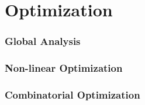\part{Optimization}\label{part:optimization}

\section{Global Analysis}\label{sec:global_analysis}

\section{Non-linear Optimization}\label{sec:nonlinear_optimization}

\section{Combinatorial Optimization}
\label{sec:combinatorial_optimization}
